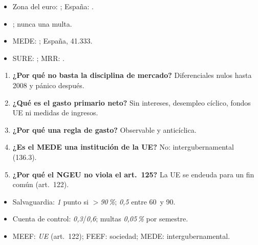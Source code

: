 \documentclass{article}
\begin{document}
\begin{columnas}
\anexorepaso
{}
\begin{itemize}
\item Zona del euro: ; España: .
\item {}; nunca una multa.
\item MEDE: ; España, 41.333.
\item SURE: ; MRR: .
\end{itemize}
\begin{enumerate}
\item \textbf{¿Por qué no basta la disciplina de mercado?} Diferenciales nulos hasta 2008 y pánico después.
\item \textbf{¿Qué es el gasto primario neto?} Sin intereses, desempleo cíclico, fondos UE ni medidas de ingresos.
\item \textbf{¿Por qué una regla de gasto?} Observable y anticíclica.
\item \textbf{¿Es el MEDE una institución de la UE?} No: intergubernamental (136.3).
\item \textbf{¿Por qué el NGEU no viola el art.~125?} La UE se endeuda para un fin común (art.~122).
\end{enumerate}
\begin{trampa}
\begin{itemize}
\item Salvaguardia: \emph{1} punto si $>$\emph{90\,\%}; \emph{0,5} entre 60~y 90.
\item Cuenta de control: \emph{0,3}/\emph{0,6}; multas \emph{0,05\,\%} por semestre.
\item MEEF: \emph{UE} (art.~122); FEEF: sociedad; MEDE: intergubernamental.
\end{itemize}
\end{trampa}

\end{columnas}
\end{document}
